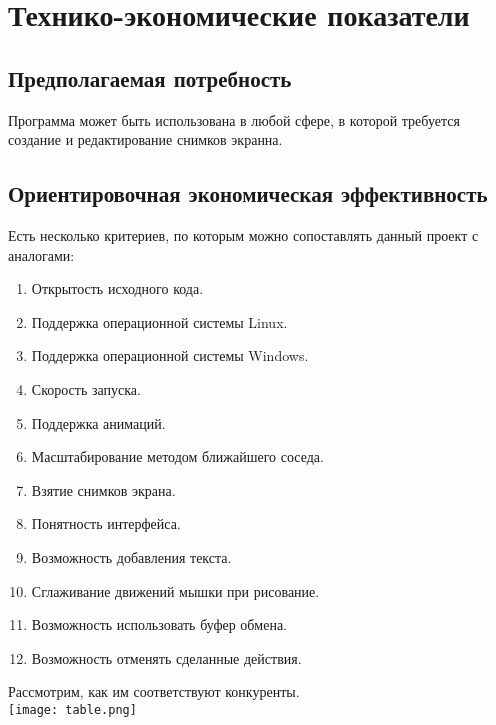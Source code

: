\documentclass[a4paper,12pt,reqno]{article}
\begin{document}
  \newpage
  \section{Технико-экономические показатели}
  \subsection{Предполагаемая потребность}
  Программа может быть использована в любой сфере, в которой требуется создание и редактирование снимков экранна.

  \subsection{Ориентировочная экономическая эффективность}
  Есть несколько критериев, по которым можно сопоставлять данный проект с аналогами:
  \begin{enumerate}
    \item Открытость исходного кода.
    \item Поддержка операционной системы Linux.
    \item Поддержка операционной системы Windows.
    \item Скорость запуска.
    \item Поддержка анимаций.
    \item Масштабирование методом ближайшего соседа.
    \item Взятие снимков экрана.
    \item Понятность интерфейса.
    \item Возможность добавления текста.
    \item Сглаживание движений мышки при рисование.
    \item Возможность использовать буфер обмена.
    \item Возможность отменять сделанные действия.
  \end{enumerate}
  Рассмотрим, как им соответствуют конкуренты. \\
  \texttt{[image: table.png]}
\end{document}

